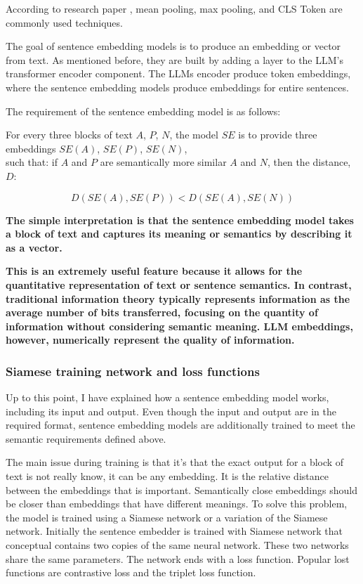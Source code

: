 \documentclass{wseas}
\begin{document}
According to research paper \cite{sbert}, mean
pooling, max pooling, and CLS Token are commonly used techniques.

The goal of sentence embedding models is to produce an embedding or
vector from text. As mentioned before, they are built by adding a layer
to the LLM's transformer encoder component. The LLMs encoder produce token
embeddings, where the sentence embedding models produce embeddings for
entire sentences.

The requirement of the sentence embedding model is as follows:

For every three blocks of text \(A\), \(P\), \(N\), the model \(SE\) is
to provide three embeddings \(SE(A)\), \(SE(P)\), \(SE(N)\),\\
such that: if \(A\) and \(P\) are semantically more similar \(A\) and
\(N\), then the distance, $D$: 

\begin{equation}
  D(SE(A), SE(P)) < D(SE(A), SE(N))
\end{equation}

\textbf{The simple interpretation is that the sentence embedding model
takes a block of text and captures its meaning or semantics by
describing it as a vector.}

\textbf{This is an extremely useful feature because it allows for the 
quantitative representation of text or sentence semantics. In contrast, 
traditional information theory typically represents information as the 
average number of bits transferred, focusing on the quantity of information 
without considering semantic meaning. LLM embeddings, however, numerically 
represent the quality of information.}

\subsubsection{Siamese training network and loss functions}

Up to this point, I have explained how a sentence embedding model works,
including its input and output. Even though the input and output are in
the required format, sentence embedding models are additionally trained
to meet the semantic requirements defined above.

The main issue during training is that it's that the exact output for a 
block of text is not really know, it can be any embedding. It is the relative
distance between the embeddings that is important. Semantically close
embeddings should be closer than embeddings that have different
meanings. To solve this problem, the model is trained using a Siamese
network or a variation of the Siamese network. Initially the sentence
embedder is trained with Siamese network that conceptual contains two
copies of the same neural network. These two networks share the same
parameters. The network ends with a loss function. Popular lost
functions are contrastive loss and the triplet loss function.
\end{document}
